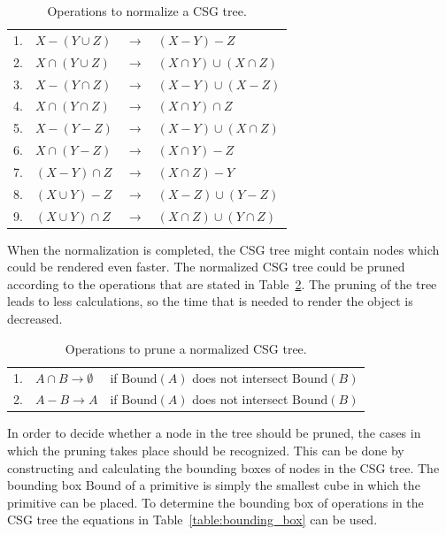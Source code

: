 \documentclass[a4paper,10pt,twoside]{report}
\newcommand{\Bound}{\mbox{Bound}}
\begin{document}
    \begin{table}[h]
        \begin{longtable}{llll}
            1. & $X - (Y \cup Z)$    & $\rightarrow$ & $(X - Y) - Z$\\
            2. & $X \cap (Y \cup Z)$ & $\rightarrow$ & $(X \cap Y) \cup (X \cap Z)$\\
            3. & $X - (Y \cap Z)$    & $\rightarrow$ & $(X - Y) \cup (X - Z)$\\
            4. & $X \cap (Y \cap Z)$ & $\rightarrow$ & $(X \cap Y) \cap Z$\\
            5. & $X - (Y - Z)$       & $\rightarrow$ & $(X - Y) \cup (X \cap Z)$\\
            6. & $X \cap (Y - Z)$    & $\rightarrow$ & $(X \cap Y) - Z$\\
            7. & $(X - Y) \cap Z$    & $\rightarrow$ & $(X \cap Z) - Y$\\
            8. & $(X \cup Y) - Z$    & $\rightarrow$ & $(X - Z) \cup (Y - Z)$\\
            9. & $(X \cup Y) \cap Z$ & $\rightarrow$ & $(X \cap Z) \cup (Y \cap Z)$\\
        \end{longtable}
        \caption{Operations to normalize a CSG tree.}
        \label{table:normalize}
    \end{table}

    When the normalization is completed, the CSG tree might contain nodes which could be rendered even faster. The normalized CSG tree could be pruned according to the operations that are stated in Table~\ref{table:prune}. The pruning of the tree leads to less calculations, so the time that is needed to render the object is decreased.\\

    \begin{table}[h]
        \begin{longtable}{lll}
            1. & $A \cap B \rightarrow \emptyset$ & if $\Bound(A)$ does not intersect $\Bound(B)$\\
            2. & $A - B \rightarrow A$            & if $\Bound(A)$ does not intersect $\Bound(B)$\\
        \end{longtable}
        \caption{Operations to prune a normalized CSG tree.}
        \label{table:prune}
    \end{table}

    In order to decide whether a node in the tree should be pruned, the cases in which the pruning takes place should be recognized. This can be done by constructing and calculating the bounding boxes of nodes in the CSG tree. The bounding box $\Bound$ of a primitive is simply the smallest cube in which the primitive can be placed. To determine the bounding box of operations in the CSG tree the equations in Table~\ref{table:bounding_box} can be used.\\
\end{document}
